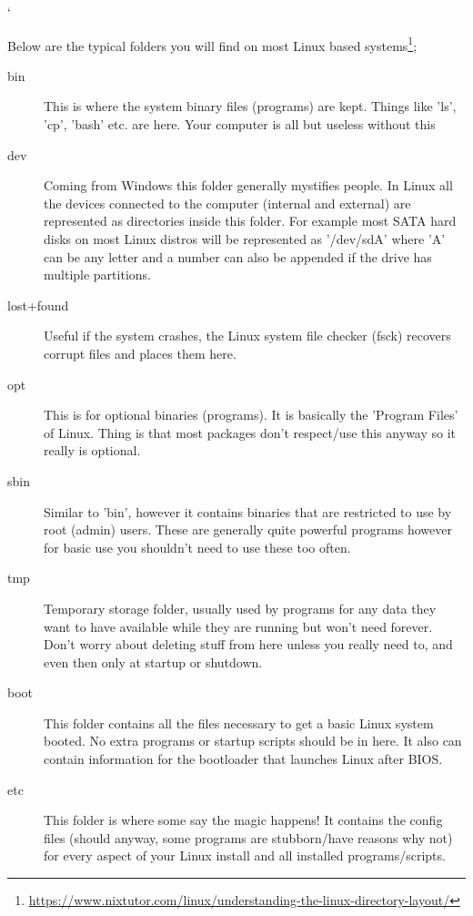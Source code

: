 `\documentclass[a4paper,11pt]{report}
\begin{document}
\begin{description}
						Below are the typical folders you will find on most Linux based systems\footnote{\url{https://www.nixtutor.com/linux/understanding-the-linux-directory-layout/}};

						\begin{description}
							\item[bin]
								This is where the system binary files (programs) are kept.
								Things like 'ls', 'cp', 'bash' etc. are here.
								Your computer is all but useless without this
							\item[dev]
							 	Coming from Windows this folder generally mystifies people.
								In Linux all the devices connected to the computer (internal and external) are represented as directories inside this folder.
								For example most SATA hard disks on most Linux distros will be represented as '/dev/sdA' where 'A' can be any letter and a number can also be appended if the drive has multiple partitions.
							\item[lost+found]
								Useful if the system crashes, the Linux system file checker (fsck) recovers corrupt files and places them here.
							\item[opt]
								This is for optional binaries (programs).
								It is basically the 'Program Files' of Linux.
								Thing is that most packages don't respect/use this anyway so it really is optional.
							\item[sbin]
								Similar to 'bin', however it contains binaries that are restricted to use by root (admin) users.
								These are generally quite powerful programs however for basic use you shouldn't need to use these too often.
							\item[tmp]
								Temporary storage folder, usually used by programs for any data they want to have available while they are running but won't need forever.
								Don't worry about deleting stuff from here unless you really need to, and even then only at startup or shutdown.
							\item[boot]
								This folder contains all the files necessary to get a basic Linux system booted.
								No extra programs or startup scripts should be in here.
								It also can contain information for the bootloader that launches Linux after BIOS.
							\item[etc]
								This folder is where some say the magic happens!
								It contains the config files (should anyway, some programs are stubborn/have reasons why not) for every aspect of your Linux install and all installed programs/scripts.

\end{description}
\end{description}
\end{document}
